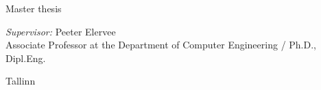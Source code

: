 \begin{titlepage}
	\vspace{2em}
	
	\begin{center}		
		\textsf{Master thesis}		 
	\end{center}
	
	\vspace{2cm}
	
	\begin{flushright}		
			
			\emph{Supervisor:} \quad Peeter Elervee \\
			\small{Associate Professor at the Department of Computer Engineering / Ph.D., Dipl.Eng.}		
	\end{flushright}
	
	\vspace{\fill}
	\begin{center} 
		Tallinn \the\year
	\end{center}	
\end{titlepage}
